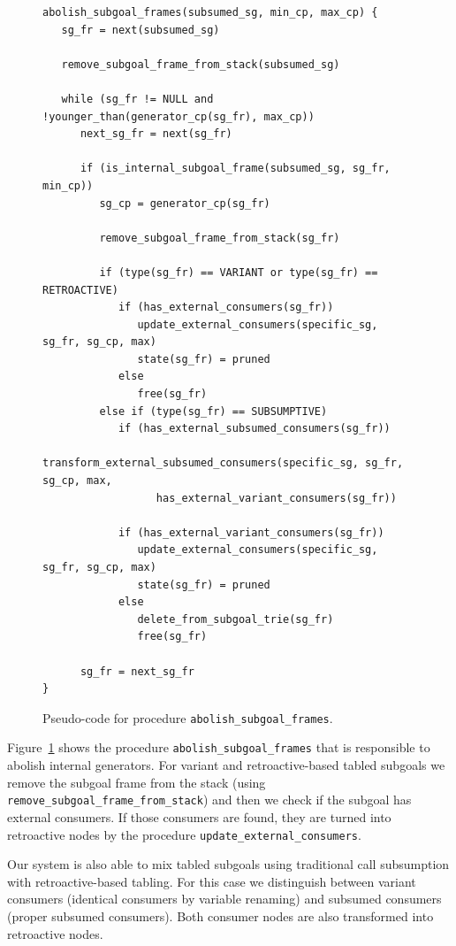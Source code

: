 \begin{figure}[ht]
\begin{Verbatim}
abolish_subgoal_frames(subsumed_sg, min_cp, max_cp) {
   sg_fr = next(subsumed_sg)

   remove_subgoal_frame_from_stack(subsumed_sg)
   
   while (sg_fr != NULL and !younger_than(generator_cp(sg_fr), max_cp))
      next_sg_fr = next(sg_fr)

      if (is_internal_subgoal_frame(subsumed_sg, sg_fr, min_cp))
         sg_cp = generator_cp(sg_fr)
         
         remove_subgoal_frame_from_stack(sg_fr)
         
         if (type(sg_fr) == VARIANT or type(sg_fr) == RETROACTIVE)
            if (has_external_consumers(sg_fr))
               update_external_consumers(specific_sg, sg_fr, sg_cp, max)
               state(sg_fr) = pruned
            else
               free(sg_fr)
         else if (type(sg_fr) == SUBSUMPTIVE)
            if (has_external_subsumed_consumers(sg_fr))
               transform_external_subsumed_consumers(specific_sg, sg_fr, sg_cp, max,
                  has_external_variant_consumers(sg_fr))
            
            if (has_external_variant_consumers(sg_fr))
               update_external_consumers(specific_sg, sg_fr, sg_cp, max)
               state(sg_fr) = pruned
            else
               delete_from_subgoal_trie(sg_fr)
               free(sg_fr)
               
      sg_fr = next_sg_fr
}
\end{Verbatim}
\caption{Pseudo-code for procedure \texttt{abolish\_subgoal\_frames}.}
\label{fig:abolish_subgoal_frames}
\end{figure}

Figure~\ref{fig:abolish_subgoal_frames} shows the procedure \texttt{abolish\_subgoal\_frames} that is
responsible to abolish internal generators. For variant and retroactive-based tabled subgoals we remove
the subgoal frame from the stack (using \texttt{remove\_subgoal\_frame\_from\_stack}) and then we check if the
subgoal has external consumers. If those consumers are found, they are turned into retroactive nodes
by the procedure \texttt{update\_external\_consumers}.

Our system is also able to mix tabled subgoals using traditional call subsumption with retroactive-based tabling.
For this case we distinguish between variant consumers (identical consumers by variable renaming) and
subsumed consumers (proper subsumed consumers). Both consumer nodes are also transformed into retroactive
nodes.

